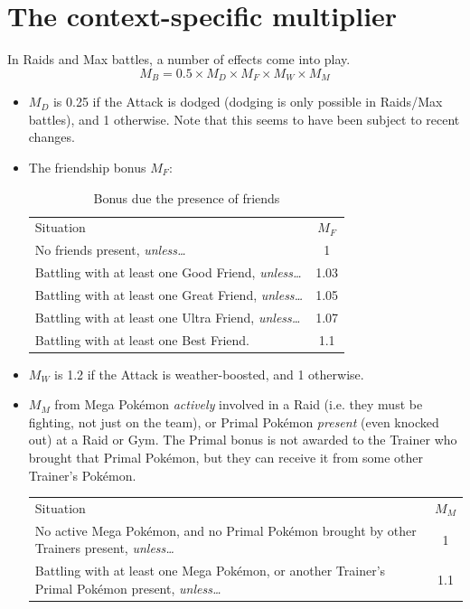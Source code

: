 \section{The context-specific multiplier}
\label{sec:mbmult}
In Raids and Max battles, a number of effects come into play.
\[ M_B = 0.5 \times M_D \times M_F \times M_W \times M_M \]
\begin{itemize}
 \item $M_D$ is 0.25 if the Attack is dodged (dodging is only possible in Raids/Max battles),
 and 1 otherwise. Note that this seems to have been subject to recent changes.
 \item The friendship bonus $M_F$:
   \begin{table}[h!]
\centering
       \begin{tabular}{lc}
         Situation & $M_F$ \\
         \Midrule
         No friends present, \textit{unless…} & 1 \\
         Battling with at least one Good Friend, \textit{unless…} & 1.03 \\
         Battling with at least one Great Friend, \textit{unless…}  & 1.05 \\
         Battling with at least one Ultra Friend, \textit{unless…} & 1.07 \\
         Battling with at least one Best Friend. & 1.1
       \end{tabular}
     \caption{Bonus due the presence of friends}
   \end{table}
 \item $M_W$ is 1.2 if the Attack is weather-boosted, and 1 otherwise.
 \item $M_M$ from Mega Pokémon \textit{actively} involved in a Raid (i.e. they
   must be fighting, not just on the team), or Primal Pokémon \textit{present}
   (even knocked out) at a Raid or Gym. The Primal bonus is not awarded to the Trainer who brought
   that Primal Pokémon, but they can receive it from some other Trainer's Pokémon.
   \begin{table}[h!]
     \centering
       \begin{tabular}{p{}c}
         Situation & $M_M$ \\
         \Midrule
         No active Mega Pokémon, and no Primal Pokémon brought
          by other Trainers present, \textit{unless…} & 1 \\
         Battling with at least one Mega Pokémon,
          or another Trainer's Primal Pokémon present, \textit{unless…} & 1.1 \\

\end{tabular}
\end{table}
\end{itemize}
